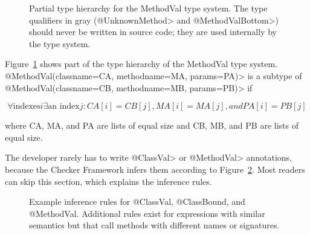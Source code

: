 \begin{figure}
\caption{Partial type hierarchy for the MethodVal type system. The type qualifiers in gray (\<@UnknownMethod>
and \<@MethodValBottom>) should never be written in source code; they are used internally by the type system.}
\label{fig-methodval-hierarchy}
\end{figure}

Figure~\ref{fig-methodval-hierarchy} shows part of the type hierarchy of  the
MethodVal type system.  \<@MethodVal(classname=CA, methodname=MA, params=PA)> is a subtype of
\<@MethodVal(classname=CB, methodname=MB, params=PB)> if

\[\forall \textrm{indexes} i \exists \textrm{an index} j:  CA[i] = CB[j], MA[i] = MA[j], and PA[i] = PB[j]\]

\noindent
where CA, MA, and PA are lists of equal size and CB, MB, and PB are lists of equal size.




The developer rarely has to write \<@ClassVal> or \<@MethodVal>
annotations, because the Checker Framework infers them according to
Figure~\ref{fig:reflection-inference}.  Most readers can skip this
section, which explains the inference rules.

\begin{figure}[t!]


\begin{center}
\begin{small}

\end{small}
\end{center}
\caption{\label{fig:reflection-inference}%
Example inference rules for @ClassVal, @ClassBound, and @MethodVal.
Additional rules exist for expressions with similar semantics but that call
methods with different names or signatures.
}
\end{figure}

